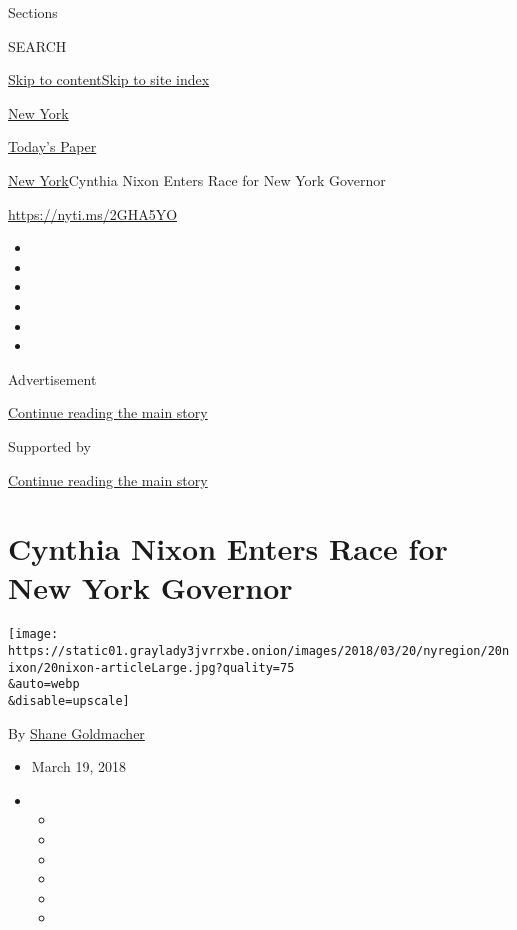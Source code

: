 Sections

SEARCH

\protect\hyperlink{site-content}{Skip to
content}\protect\hyperlink{site-index}{Skip to site index}

\href{https://www.nytimes3xbfgragh.onion/section/nyregion}{New York}

\href{https://myaccount.nytimes3xbfgragh.onion/auth/login?response_type=cookie\&client_id=vi}{}

\href{https://www.nytimes3xbfgragh.onion/section/todayspaper}{Today's
Paper}

\href{/section/nyregion}{New York}\textbar{}Cynthia Nixon Enters Race
for New York Governor

\url{https://nyti.ms/2GHA5YO}

\begin{itemize}
\item
\item
\item
\item
\item
\item
\end{itemize}

Advertisement

\protect\hyperlink{after-top}{Continue reading the main story}

Supported by

\protect\hyperlink{after-sponsor}{Continue reading the main story}

\hypertarget{cynthia-nixon-enters-race-for-new-york-governor}{%
\section{Cynthia Nixon Enters Race for New York
Governor}\label{cynthia-nixon-enters-race-for-new-york-governor}}

\texttt{[image: https://static01.graylady3jvrrxbe.onion/images/2018/03/20/nyregion/20nixon/20nixon-articleLarge.jpg?quality=75\\\&auto=webp\\\&disable=upscale]}

By \href{https://www.nytimes3xbfgragh.onion/by/shane-goldmacher}{Shane
Goldmacher}

\begin{itemize}
\item
  March 19, 2018
\item
  \begin{itemize}
  \item
  \item
  \item
  \item
  \item
  \item
  \end{itemize}
\end{itemize}

